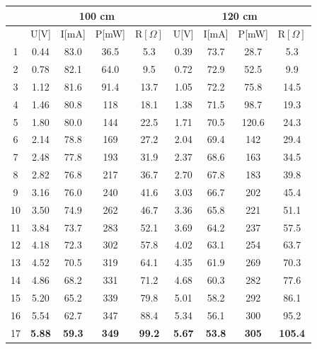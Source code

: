 \documentclass[12pt]{article}
\begin{document}
\begin{table}[H]
\centering
\begin{tabular}{|c|c|c|c|c|c|c|c|c|}
\hline
   & \multicolumn{4}{c|}{100 cm}      & \multicolumn{4}{c|}{120 cm}      \\ \hline
   & U[V]        & I[mA]  &P[mW] &R$[\Omega]$    & U[V]        & I[mA]    &P[mW]  &R$[\Omega]$  \\ \hline
1  & 0.44        & 83.0   &36.5 &5.3     & 0.39        & 73.7     &28.7  &5.3  \\ \hline
2  & 0.78        & 82.1   &64.0 &9.5     & 0.72        & 72.9     &52.5  &9.9  \\ \hline
3  & 1.12        & 81.6   &91.4 &13.7    & 1.05        & 72.2     &75.8  &14.5 \\ \hline
4  & 1.46        & 80.8   &118  &18.1    & 1.38        & 71.5     &98.7  &19.3  \\ \hline
5  & 1.80        & 80.0   &144  &22.5    & 1.71        & 70.5     &120.6 &24.3   \\ \hline
6  & 2.14        & 78.8   &169  &27.2    & 2.04        & 69.4     &142   &29.4 \\ \hline
7  & 2.48        & 77.8   &193  &31.9    & 2.37        & 68.6     &163   &34.5 \\ \hline
8  & 2.82        & 76.8   &217  &36.7    & 2.70        & 67.8     &183   &39.8 \\ \hline
9  & 3.16        & 76.0   &240  &41.6    & 3.03        & 66.7     &202   &45.4 \\ \hline
10 & 3.50        & 74.9   &262  &46.7    & 3.36        & 65.8     &221   &51.1 \\ \hline
11 & 3.84        & 73.7   &283  &52.1    & 3.69        & 64.2     &237   &57.5 \\ \hline
12 & 4.18        & 72.3   &302  &57.8    & 4.02        & 63.1     &254   &63.7 \\ \hline
13 & 4.52        & 70.5   &319  &64.1    & 4.35        & 61.9     &269   &70.3 \\ \hline
14 & 4.86        & 68.2   &331  &71.2    & 4.68        & 60.3     &282   &77.6 \\ \hline
15 & 5.20        & 65.2   &339  &79.8    & 5.01        & 58.2     &292   &86.1 \\ \hline
16 & 5.54        & 62.7   &347  &88.4    & 5.34        & 56.1     &300   &95.2 \\ \hline
17 & \textbf{5.88}  &\textbf{59.3}   &\textbf{349}&\textbf{99.2}      & \textbf{5.67}        & \textbf{53.8}     &\textbf{305}  &\textbf{105.4}  \\ \hline

\end{tabular}
\end{table}
\end{document}
